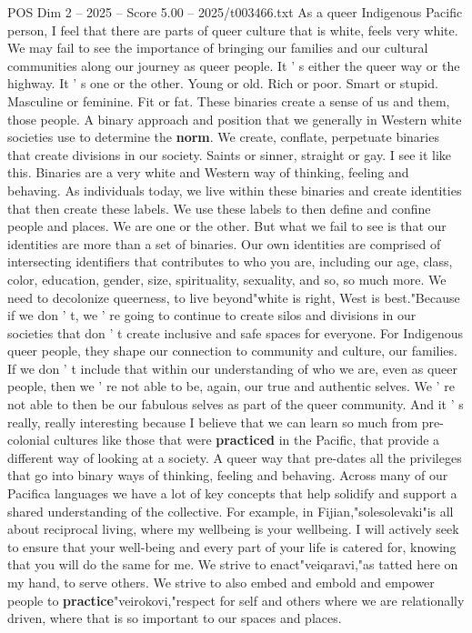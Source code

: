 \begin{textsample}{POS Dim 2 – 2025 – Score 5.00 – 2025/t003466.txt}
As a queer Indigenous Pacific person, I feel that there are parts of queer culture that is white, feels very white.
We may fail to see the importance of bringing our families and our cultural communities along our journey as queer people.
It ' s either the queer way or the highway.
It ' s one or the other.
Young or old.
Rich or poor.
Smart or stupid.
Masculine or feminine.
Fit or fat.
These binaries create a sense of us and them, those people.
A binary approach and position that we generally in Western white societies use to determine the \textbf{norm}.
We create, conflate, perpetuate binaries that create divisions in our society.
Saints or sinner, straight or gay.
I see it like this.
Binaries are a very white and Western way of thinking, feeling and behaving.
As individuals today, we live within these binaries and create identities that then create these labels.
We use these labels to then define and confine people and places.
We are one or the other.
But what we fail to see is that our identities are more than a set of binaries.
Our own identities are comprised of intersecting identifiers that contributes to who you are, including our age, class, color, education, gender, size, spirituality, sexuality, and so, so much more.
We need to decolonize queerness, to live beyond"white is right, West is best."Because if we don ' t, we ' re going to continue to create silos and divisions in our societies that don ' t create inclusive and safe spaces for everyone.
For Indigenous queer people, they shape our connection to community and culture, our families.
If we don ' t include that within our understanding of who we are, even as queer people, then we ' re not able to be, again, our true and authentic selves.
We ' re not able to then be our fabulous selves as part of the queer community.
And it ' s really, really interesting because I believe that we can learn so much from pre-colonial cultures like those that were \textbf{practiced} in the Pacific, that provide a different way of looking at a society.
A queer way that pre-dates all the privileges that go into binary ways of thinking, feeling and behaving.
Across many of our Pacifica languages we have a lot of key concepts that help solidify and support a shared understanding of the collective.
For example, in Fijian,"solesolevaki"is all about reciprocal living, where my wellbeing is your wellbeing.
I will actively seek to ensure that your well-being and every part of your life is catered for, knowing that you will do the same for me.
We strive to enact"veiqaravi,"as tatted here on my hand, to serve others.
We strive to also embed and embold and empower people to \textbf{practice}"veirokovi,"respect for self and others where we are relationally driven, where that is so important to our spaces and places.

\end{textsample}
